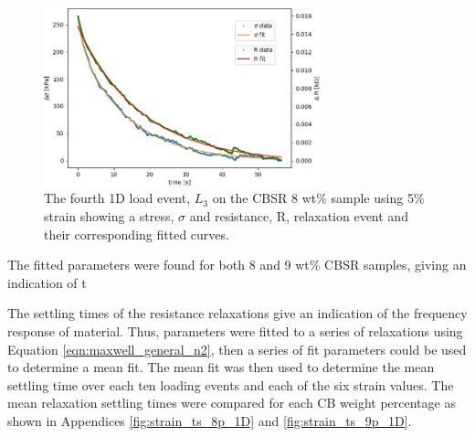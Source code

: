 \begin{figure}[h!]
    \centering
    \includegraphics[width=8cm]{Figures/Push event 3 - CBSR 8 wt 5p strain - 1D compression test.jpg}
    \caption{The fourth 1D load event, $L_{3}$ on the CBSR 8 wt\% sample using 5\% strain showing a stress, $\sigma$ and resistance, R, relaxation event and their corresponding fitted curves.}
    \label{fig:push_event_relax_example}
\end{figure}


The fitted parameters were found for both 8 and 9 wt\% CBSR samples, giving an indication of t

The settling times of the resistance relaxations give an indication of the frequency response of material. Thus, parameters were fitted to a series of relaxations using Equation \ref{eqn:maxwell_general_n2}, then a series of fit parameters could be used to determine a mean fit. The mean fit was then used to determine the mean settling time over each ten loading events and each of the six strain values. The mean relaxation settling times were compared for each CB weight percentage as shown in Appendices \ref{fig:strain_ts_8p_1D} and \ref{fig:strain_ts_9p_1D}.

